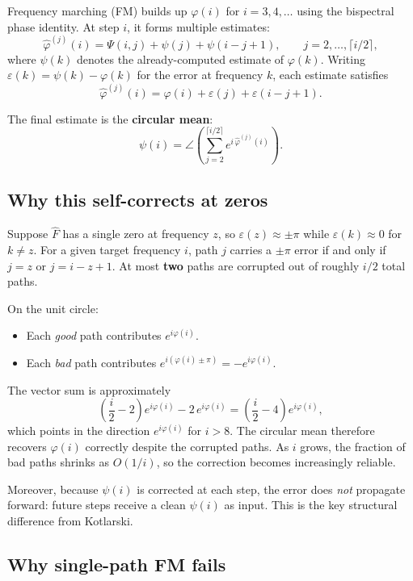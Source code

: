 \documentclass[11pt]{article}
\newcommand{\Fhat}{\hat{F}}
\begin{document}
Frequency marching (FM) builds up $\varphi(i)$ for $i = 3, 4, \ldots$
using the bispectral phase identity.  At step $i$, it forms multiple
estimates:
\[
    \widehat\varphi^{(j)}(i) = \Psi(i, j) + \psi(j) + \psi(i-j+1),
    \qquad j = 2, \ldots, \lceil i/2 \rceil,
\]
where $\psi(k)$ denotes the already-computed estimate of $\varphi(k)$.
Writing $\varepsilon(k) = \psi(k) - \varphi(k)$ for the error at
frequency $k$, each estimate satisfies
\[
    \widehat\varphi^{(j)}(i)
    = \varphi(i) + \varepsilon(j) + \varepsilon(i-j+1).
\]

The final estimate is the \textbf{circular mean}:
\[
    \psi(i) = \angle\!\left(\sum_{j=2}^{\lceil i/2\rceil}
    e^{i\,\widehat\varphi^{(j)}(i)}\right).
\]

\subsection*{Why this self-corrects at zeros}

Suppose $\Fhat$ has a single zero at frequency $z$, so
$\varepsilon(z) \approx \pm\pi$ while $\varepsilon(k) \approx 0$ for
$k \neq z$.  For a given target frequency $i$, path $j$ carries a
$\pm\pi$ error if and only if $j = z$ or $j = i-z+1$.  At most
\textbf{two} paths are corrupted out of roughly $i/2$ total paths.

On the unit circle:
\begin{itemize}
    \item Each \emph{good} path contributes $e^{i\varphi(i)}$.
    \item Each \emph{bad} path contributes $e^{i(\varphi(i)\pm\pi)}
          = -e^{i\varphi(i)}$.
\end{itemize}
The vector sum is approximately
\[
    \left(\frac{i}{2} - 2\right)e^{i\varphi(i)}
    - 2\,e^{i\varphi(i)}
    = \left(\frac{i}{2} - 4\right)e^{i\varphi(i)},
\]
which points in the direction $e^{i\varphi(i)}$ for $i > 8$.  The
circular mean therefore recovers $\varphi(i)$ correctly despite the
corrupted paths.  As $i$ grows, the fraction of bad paths shrinks
as $O(1/i)$, so the correction becomes increasingly reliable.

Moreover, because $\psi(i)$ is corrected at each step, the error does
\emph{not} propagate forward: future steps receive a clean $\psi(i)$
as input.  This is the key structural difference from Kotlarski.

\subsection*{Why single-path FM fails}
\end{document}
